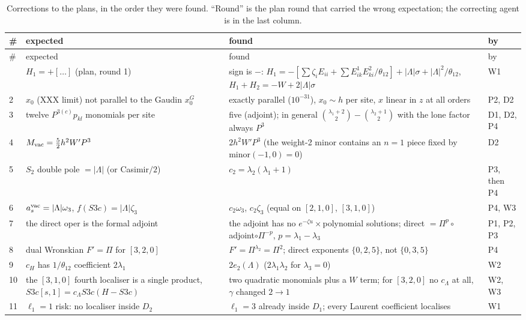 \documentclass[11pt]{article}
\begin{document}
{\footnotesize
\begin{longtable}{p{0.3cm}p{5.2cm}p{5.8cm}p{2.6cm}}
\caption{Corrections to the plans, in the order they were found.
``Round'' is the plan round that carried the wrong expectation; the correcting agent is in the last column.}\label{tab:surprises}\\
\toprule
\# & expected & found & by \\
\midrule
\endfirsthead
\toprule
\# & expected & found & by \\
\midrule
\endhead
\bottomrule
\endlastfoot
1 & $H_1=+[\ldots]$ (plan, round 1) & sign is $-$: $H_1=-[\sum\zeta_iE_{ii}+\sum E^1_{ik}E^2_{ki}/\theta_{12}]+|\Lambda|\sigma+|\Lambda|^2/\theta_{12}$, $H_1+H_2=-W+2|\Lambda|\sigma$ & W1 \\
2 & $x_0$ (XXX limit) not parallel to the Gaudin $x_0^G$ & exactly parallel ($10^{-31}$), $x_0\sim h$ per site, $x$ linear in $z$ at all orders & P2, D2 \\
3 & twelve $P^{3(c)}p_{kl}$ monomials per site & five (adjoint); in general $\binom{\lambda_1+2}2-\binom{\lambda_2+1}2$ with the lone factor always $P^3$ & D1, D2, P4 \\
4 & $M_{\rm vac}=\tfrac52h^2W'P^3$ & $2h^2W'P^3$ (the weight-2 minor contains an $n=1$ piece fixed by $\mathrm{minor}(-1,0)=0$) & D2 \\
5 & $S_2$ double pole $=|\Lambda|$ (or Casimir$/2$) & $c_2=\lambda_2(\lambda_1+1)$ & P3, then P4 \\
6 & $a_s^{\rm vac}=|\Lambda|\omega_3$, $f(S3c)=|\Lambda|\zeta_3$ & $c_2\omega_3$, $c_2\zeta_3$ (equal on $[2,1,0]$, $[3,1,0]$) & P4, W3 \\
7 & the direct oper is the formal adjoint & the adjoint has no $e^{-\zeta u}\times$polynomial solutions; direct $=\Pi^p\circ$adjoint$\circ\Pi^{-p}$, $p=\lambda_1-\lambda_3$ & P1, P2, P3 \\
8 & dual Wronskian $F'=\Pi$ for $[3,2,0]$ & $F'=\Pi^{\lambda_2}=\Pi^2$; direct exponents $\{0,2,5\}$, not $\{0,3,5\}$ & P4 \\
9 & $c_H$ has $1/\theta_{12}$ coefficient $2\lambda_1$ & $2e_2(\Lambda)$ ($2\lambda_1\lambda_2$ for $\lambda_3=0$) & W2 \\
10 & the $[3,1,0]$ fourth localiser is a single product, $S3c[s,1]=c_\Lambda S3c(H-S3c)$ & two quadratic monomials plus a $W$ term; for $[3,2,0]$ no $c_\Lambda$ at all, $\gamma$ changed $2\to1$ & W2, W3 \\
11 & $\ell_1=1$ risk: no localiser inside $D_2$ & $\ell_1=3$ already inside $D_1$; every Laurent coefficient localises & W1 \\

\end{longtable}}
\end{document}
